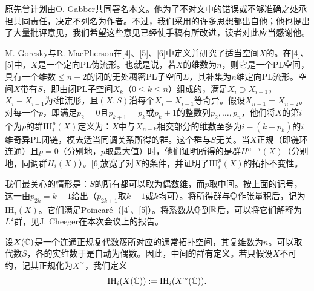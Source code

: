 原先曾计划由O. Gabber共同署名本文。他为了不对文中的错误或不够准确之处承担共同责任，决定不列名为作者。不过，我们采用的许多思想都出自他；他也提出了大量批评意见，我们希望这些意见已经使手稿有所改进，读者对此应当感谢他。

M. Goresky与R. MacPherson在[4]、[5]、[6]中定义并研究了适当空间$X$的。在[4]、[5]中，$X$是一个定向PL伪流形。也就是说，若$X$的维数为$n$，则它是一个PL空间，具有一个维数$\leq n-2$的闭的无处稠密PL子空间$\Sigma$，其补集为$n$维定向PL流形。空间$X$带有$S$，即由闭PL子空间$X_k$（$0\leq k\leq n$）组成的，满足$X_i\supset X_{i-1}$，$X_i-X_{i-1}$为$i$维流形，且$(X,S)$沿每个$X_i-X_{i-1}$等奇异。假设$X_{n-1}=X_{n-2}$。对每一个$p$，即满足$p_2=0$且$p_{k+1}=p_k$或$p_k+1$的整数列$p_2,\ldots,p_n$，他们将$X$的第$i$个为$p$的群$\mathrm{IH}_i^p(X)$定义为：$X$中与$X_{n-k}$相交部分的维数至多为$i-(k-p_k)$的$i$维奇异PL闭链，模去适当同调关系所得的群。这个群与$S$无关。当$X$正规（即链环连通）且$p=0$（分别地，$p$取最大值）时，他们证明所得的是群$H^{n-i}(X)$（分别地，同调群$H_i(X)$）。[6]放宽了对$X$的条件，并证明了$\mathrm{IH}_i^p(X)$的拓扑不变性。

我们最关心的情形是：$S$的所有都可以取为偶数维，而$p$取中间。按上面的记号，这一由$p_{2k}=k-1$给出（$p_{2k+1}$取$k-1$或$k$均可）。将所得群与$\mathbb Q$作张量积后，记为$\mathrm{IH}_i(X)$。它们满足Poincaré（[4]、[5]）。将系数从$\mathbb Q$到$\mathbb R$后，可以将它们解释为$L^2$群，见J. Cheeger在本次会议上的报告。

设$X(\mathbb C)$是一个连通正规复代数簇所对应的通常拓扑空间，其复维数为$n$。可以取代数$S$，各的实维数于是自动为偶数。因此，中间的群有定义。若只假设$X$不可约，记其正规化为$X^{\sim}$，我们定义
\[
\mathrm{IH}_i(X(\mathbb C)):=\mathrm{IH}_i(X^{\sim}(\mathbb C)).
\]

